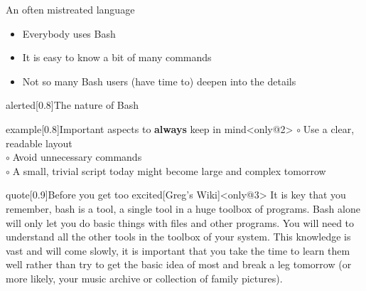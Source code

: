 
\begin{frame}{An often mistreated language}
    \vspace{-3mm}
    \begin{itemize}
        \item Everybody uses Bash
        \item It is easy to know a bit of many commands
        \item Not so many Bash users (have time to) deepen into the details
    \end{itemize}
    \begin{varblock}{alerted}[0.8\textwidth]{The nature of Bash}
    \end{varblock}
    \begin{overlayarea}{\textwidth}{0.6\textheight}
        \begin{varblock*}{example}[0.8\textwidth]{Important aspects to \textbf{always} keep in mind}<only@2>
            $\circ\;$Use a clear, readable layout\\
            $\circ\;$Avoid unnecessary commands\\
            $\circ\;$A small, trivial script today might become large and complex tomorrow
        \end{varblock*}
        \begin{varblock}{quote}[0.9\textwidth]{Before you get too excited}[Greg's Wiki]<only@3>
            It is key that you remember, bash is a tool, a single tool in a huge toolbox of programs. 
            Bash alone will only let you do basic things with files and other programs.
            You will need to understand all the other tools in the toolbox of your system.
            This knowledge is vast and will come slowly, it is important that you take the time to learn them well rather than try to get the basic idea of most and break a leg tomorrow (or more likely, your music archive or collection of family pictures).
        \end{varblock}
    \end{overlayarea}
\end{frame}
